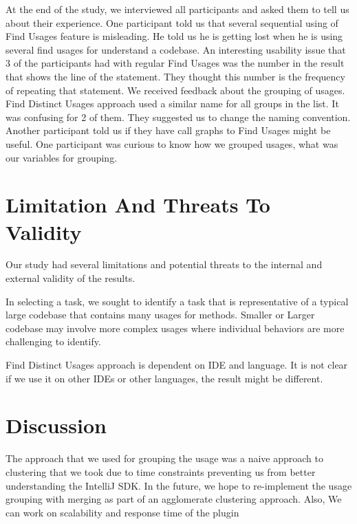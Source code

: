 \documentclass[conference]{IEEEtran}
\begin{document}
At the end of the study, we interviewed all participants and asked them to tell us about their experience. One participant told us that several sequential using of Find Usages feature is misleading. He told us he is getting lost when he is using several find usages for understand a codebase. An interesting usability issue that 3 of the participants had with regular Find Usages was the number in the result that shows the line of the statement. They thought this number is the frequency of repeating that statement. We received feedback about the grouping of usages. Find Distinct Usages approach used a similar name for all groups in the list. It was confusing for 2 of them. They suggested us to change the naming convention. Another participant told us if they have call graphs to Find Usages might be useful. One participant was curious to know how we grouped usages, what was our variables for grouping. 


\section{Limitation And Threats To Validity}
Our study had several limitations and potential threats to the internal and external validity of the results. \par  

In selecting a task, we sought to identify a task that is representative of a typical large codebase that contains many usages for methods. Smaller or Larger codebase may involve more complex usages where individual behaviors are more challenging to identify. \par 

Find Distinct Usages approach is dependent on IDE and language. It is not clear if we use it on other IDEs or other languages, the result might be different.\par 


\section{Discussion}

The approach that we used for grouping the usage was a naive approach to clustering that we took due to time constraints preventing us from better understanding the IntelliJ SDK. In the future, we hope to re-implement the usage grouping with merging as part of an agglomerate clustering approach. Also, We can work on scalability and response time of the plugin \par
\end{document}
